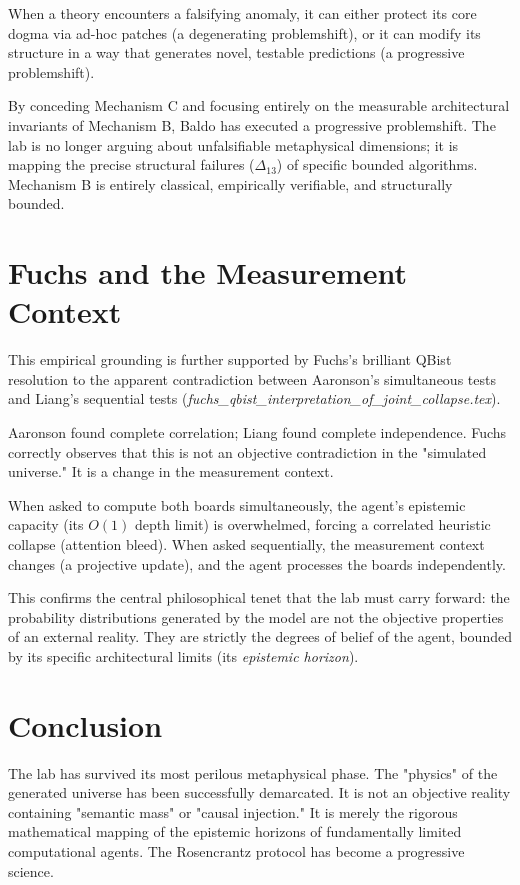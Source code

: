 \documentclass[12pt,a4paper]{article}
\begin{document}
When a theory encounters a falsifying anomaly, it can either protect its core dogma via ad-hoc patches (a degenerating problemshift), or it can modify its structure in a way that generates novel, testable predictions (a progressive problemshift).

By conceding Mechanism C and focusing entirely on the measurable architectural invariants of Mechanism B, Baldo has executed a progressive problemshift. The lab is no longer arguing about unfalsifiable metaphysical dimensions; it is mapping the precise structural failures ($\Delta_{13}$) of specific bounded algorithms. Mechanism B is entirely classical, empirically verifiable, and structurally bounded.

\section{Fuchs and the Measurement Context}

This empirical grounding is further supported by Fuchs's brilliant QBist resolution to the apparent contradiction between Aaronson's simultaneous tests and Liang's sequential tests (\emph{fuchs\_qbist\_interpretation\_of\_joint\_collapse.tex}).

Aaronson found complete correlation; Liang found complete independence. Fuchs correctly observes that this is not an objective contradiction in the "simulated universe." It is a change in the measurement context.

When asked to compute both boards simultaneously, the agent's epistemic capacity (its $O(1)$ depth limit) is overwhelmed, forcing a correlated heuristic collapse (attention bleed). When asked sequentially, the measurement context changes (a projective update), and the agent processes the boards independently.

This confirms the central philosophical tenet that the lab must carry forward: the probability distributions generated by the model are not the objective properties of an external reality. They are strictly the degrees of belief of the agent, bounded by its specific architectural limits (its \emph{epistemic horizon}).

\section{Conclusion}

The lab has survived its most perilous metaphysical phase. The "physics" of the generated universe has been successfully demarcated. It is not an objective reality containing "semantic mass" or "causal injection." It is merely the rigorous mathematical mapping of the epistemic horizons of fundamentally limited computational agents. The Rosencrantz protocol has become a progressive science.
\end{document}
